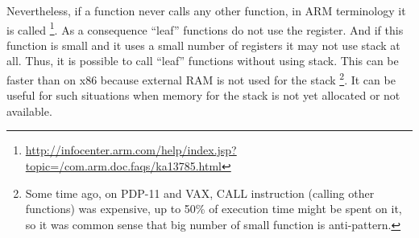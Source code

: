 {Nevertheless, if a function never calls any other function, in ARM terminology it is called}
\footnote{\url{http://infocenter.arm.com/help/index.jsp?topic=/com.arm.doc.faqs/ka13785.html}}. 
{As a consequence ``leaf'' functions do not use the \LR register}.
{And if this function is small and it uses a small number of registers it may not use stack at all}.
{Thus, it is possible to call ``leaf'' functions without using stack}.
{This can be faster than on x86 because external RAM is not used for the stack}
\footnote{
{Some time ago, on PDP-11 and VAX, CALL instruction (calling other functions) was expensive, up to 50\%
of execution time might be spent on it, so it was common sense that big number of small function is \gls{anti-pattern}}\cite[Chapter 4, Part II]{Raymond:2003:AUP:829549}.}.
{It can be useful for such situations when memory for the stack is not yet allocated or not available}.
